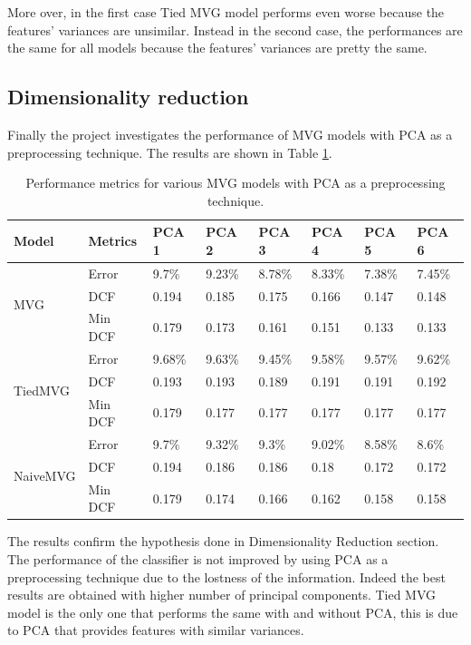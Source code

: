 \documentclass{article}
\begin{document}
More over, in the first case Tied MVG model performs even worse because the features' variances are unsimilar. Instead in the second case, the performances are the same for all models because the features' variances are pretty the same.

\subsection{Dimensionality reduction}
Finally the project investigates the performance of MVG models with PCA as a preprocessing technique. The results are shown in Table \ref{tab:mvg_performance_pca}.

\begin{table}[ht]
    \centering
    \begin{tabularx}{\textwidth}{ll*{6}{X}}
        \toprule
        \textbf{Model} & \textbf{Metrics} & \textbf{PCA 1} & \textbf{PCA 2} & \textbf{PCA 3} & \textbf{PCA 4} & \textbf{PCA 5} & \textbf{PCA 6} \\
        \midrule
        \multirow{3}{*}{MVG} & Error & 9.7\% & 9.23\% & 8.78\% & 8.33\% & 7.38\% & 7.45\% \\
                              & DCF & 0.194 & 0.185 & 0.175 & 0.166 & 0.147 & 0.148 \\
                              & Min DCF & 0.179 & 0.173 & 0.161 & 0.151 & 0.133 & 0.133 \\
        \midrule
        \multirow{3}{*}{TiedMVG} & Error & 9.68\% & 9.63\% & 9.45\% & 9.58\% & 9.57\% & 9.62\% \\
                                 & DCF & 0.193 & 0.193 & 0.189 & 0.191 & 0.191 & 0.192 \\
                                 & Min DCF & 0.179 & 0.177 & 0.177 & 0.177 & 0.177 & 0.177 \\
        \midrule
        \multirow{3}{*}{NaiveMVG} & Error & 9.7\% & 9.32\% & 9.3\% & 9.02\% & 8.58\% & 8.6\% \\
                                  & DCF & 0.194 & 0.186 & 0.186 & 0.18 & 0.172 & 0.172 \\
                                  & Min DCF & 0.179 & 0.174 & 0.166 & 0.162 & 0.158 & 0.158 \\
        \bottomrule
    \end{tabularx}
    \caption{Performance metrics for various MVG models with PCA as a preprocessing technique.}
    \label{tab:mvg_performance_pca}
\end{table}


The results confirm the hypothesis done in Dimensionality Reduction section. The performance of the classifier is not improved by using PCA as a preprocessing technique due to the lostness of the information. Indeed the best results are obtained with higher number of principal components. Tied MVG model is the only one that performs the same with and without PCA, this is due to PCA that provides features with similar variances.
\end{document}
